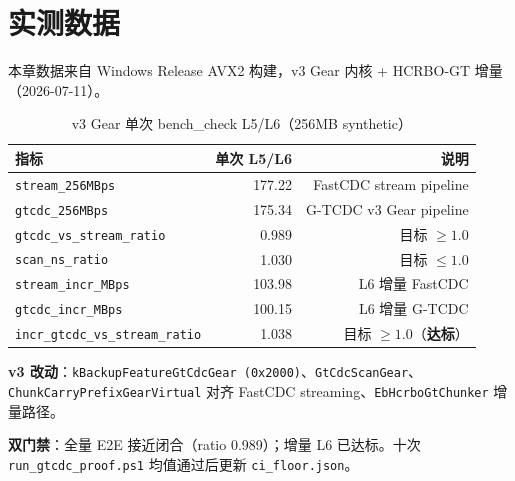 \chapter{实测数据}
\label{ch:data}

本章数据来自 Windows Release AVX2 构建，v3 Gear 内核 + HCRBO-GT 增量（2026-07-11）。

\begin{table}[htbp]
\centering
\begin{tabular}{@{}lrr@{}}
\toprule
指标 & 单次 L5/L6 & 说明 \\
\midrule
\texttt{stream\_256MBps} & 177.22 & FastCDC stream pipeline \\
\texttt{gtcdc\_256MBps} & 175.34 & G-TCDC v3 Gear pipeline \\
\texttt{gtcdc\_vs\_stream\_ratio} & 0.989 & 目标 $\ge 1.0$ \\
\texttt{scan\_ns\_ratio} & 1.030 & 目标 $\le 1.0$ \\
\midrule
\texttt{stream\_incr\_MBps} & 103.98 & L6 增量 FastCDC \\
\texttt{gtcdc\_incr\_MBps} & 100.15 & L6 增量 G-TCDC \\
\texttt{incr\_gtcdc\_vs\_stream\_ratio} & 1.038 & 目标 $\ge 1.0$（\textbf{达标}） \\
\bottomrule
\end{tabular}
\caption{v3 Gear 单次 bench\_check L5/L6（256MB synthetic）}
\end{table}

\textbf{v3 改动}：\texttt{kBackupFeatureGtCdcGear (0x2000)}、\texttt{GtCdcScanGear}、\texttt{ChunkCarryPrefixGearVirtual} 对齐 FastCDC streaming、\texttt{EbHcrboGtChunker} 增量路径。

\textbf{双门禁}：全量 E2E 接近闭合（ratio 0.989）；增量 L6 已达标。十次 \texttt{run\_gtcdc\_proof.ps1} 均值通过后更新 \texttt{ci\_floor.json}。
